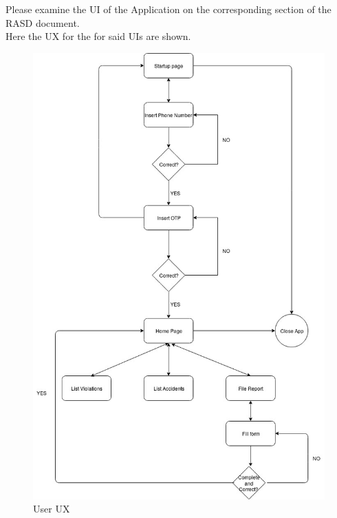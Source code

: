 \begin{flushleft}
Please examine the UI of the Application on the corresponding 
section of the RASD document.\\
Here the UX for the for said UIs are shown.
\end{flushleft}
\begin{figure}[H]
	\centering
    \includegraphics[scale=0.5]{Images/user_ux.jpg}
    \caption{\label{fig:UserUX}User UX}
\end{figure}
\newpage
\vspace{2cm}
\newpage
